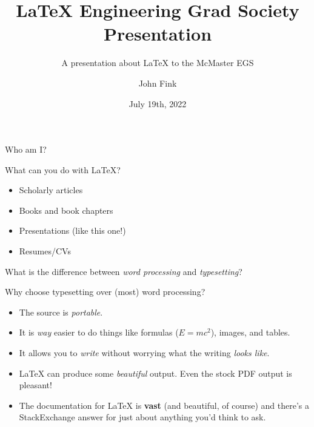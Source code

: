 \documentclass{beamer}
\title{\LaTeX{} Engineering Grad Society Presentation}
\subtitle{A presentation about \LaTeX{} to the McMaster EGS}
\author{John Fink}
\institute{McMaster University}
\date{July 19th, 2022}
\begin{document}
	\begin{frame}
		\titlepage
	\end{frame}

	\begin{frame}
		Who am I?
	\end{frame}

\begin{frame}
	What can you do with \LaTeX{}?
\end{frame}

\begin{frame}
	\begin{itemize}
		\item Scholarly articles
		\pause
		\item Books and book chapters
		\pause
		\item Presentations (like this one!)
		\pause
		\item Resumes/CVs
	\end{itemize}
\end{frame}
		

\begin{frame}
	What is the difference between \textit{word processing} and \textit{typesetting}?
\end{frame}

\begin{frame}
	Why choose typesetting over (most) word processing?
	\begin{itemize}
		\item The source is \textit{portable}.
		\pause
		\item It is \textit{way} easier to do things like formulas ($E=mc^2$), images, and tables.
		\pause
		\item It allows you to \textit{write} without worrying what the writing \textit{looks like}.
		\pause
		\item \LaTeX{} can produce some \textit{beautiful} output. Even the stock PDF output is pleasant!
		\pause
		\item The documentation for \LaTeX{} is \textbf{vast} (and beautiful, of course) and there's a StackExchange answer for just about anything you'd think to ask.
	\end{itemize}
	

\end{frame}
\end{document}

